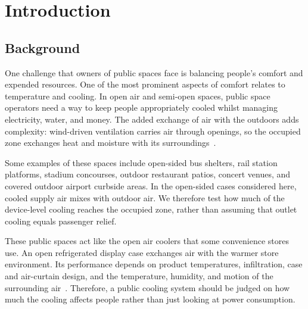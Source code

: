 
\section{Introduction}

\vspace{8 pt}

\vspace{8 pt}

\subsection{Background}

\vspace{8 pt}



One challenge that owners of public spaces face is balancing people’s comfort and expended resources. One of the most prominent aspects of comfort relates to temperature and cooling. In open air and semi-open spaces, public space operators need a way to keep people appropriately cooled whilst managing electricity, water, and money. The added exchange of air with the outdoors adds complexity: wind-driven ventilation carries air through openings, so the occupied zone exchanges heat and moisture with its surroundings~\cite{energyplus_wind_ventilation}.

\vspace{4 pt}

Some examples of these spaces include open-sided bus shelters, rail station platforms, stadium concourses, outdoor restaurant patios, concert venues, and covered outdoor airport curbside areas. In the open-sided cases considered here, cooled supply air mixes with outdoor air. We therefore test how much of the device-level cooling reaches the occupied zone, rather than assuming that outlet cooling equals passenger relief.

\vspace{4 pt}

These public spaces act like the open air coolers that some convenience stores use. An open refrigerated display case exchanges air with the warmer store environment. Its performance depends on product temperatures, infiltration, case and air-curtain design, and the temperature, humidity, and motion of the surrounding air~\cite{ashrae_refrigeration_2022}. Therefore, a public cooling system should be judged on how much the cooling affects people rather than just looking at power consumption. 


\vspace{8 pt}

